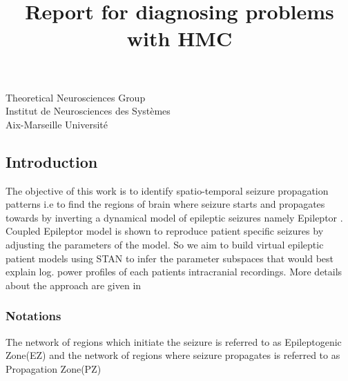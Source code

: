 \documentclass[12pt]{article}
\title{Report for diagnosing problems with HMC}
\begin{document}
\begin{titlepage}
  \maketitle
  \begin{center}
    Theoretical Neurosciences Group \\
    Institut de Neurosciences des Systèmes \\
    Aix-Marseille Université
  \end{center}
\end{titlepage}

\subsection*{Introduction}
The objective of this work is to identify spatio-temporal seizure propagation patterns i.e to find the regions of brain where seizure starts and propagates towards by inverting a dynamical model of epileptic seizures namely Epileptor \cite{jirsa2014nature}. Coupled Epileptor model \cite{proix2014permittivity} is shown to reproduce patient specific seizures by adjusting the parameters of the model. So we aim to build virtual epileptic patient models using STAN to infer the parameter subspaces that would best explain log. power profiles of each patients intracranial recordings. More details about the approach are given in \cite{jirsa2017virtual}

\subsubsection*{Notations}
The network of regions which initiate the seizure is referred to as Epileptogenic Zone(EZ) and the network of regions where seizure propagates is referred to as Propagation Zone(PZ)
\end{document}

